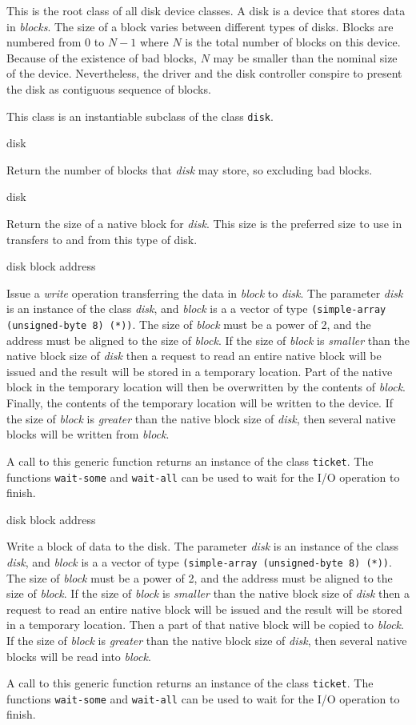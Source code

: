 
This is the root class of all disk device classes.  A disk is a device
that stores data in \emph{blocks}.  The size of a block varies between
different types of disks.  Blocks are numbered from $0$ to $N-1$ where
$N$ is the total number of blocks on this device.  Because of the
existence of bad blocks, $N$ may be smaller than the nominal size of
the device.  Nevertheless, the driver and the disk controller conspire
to present the disk as contiguous sequence of blocks. 


This class is an instantiable subclass of the class \texttt{disk}. 

 {disk}

Return the number of blocks that \textit{disk} may store, so excluding
bad blocks.

 {disk}

Return the size of a native block for \textit{disk}.  This size is the
preferred size to use in transfers to and from this type of disk.

 {disk block address}

Issue a \emph{write} operation transferring the data in \textit{block}
to \textit{disk}.  The parameter \textit{disk} is an
instance of the class \textit{disk}, and \textit{block} is a a vector
of type \texttt{(simple-array (unsigned-byte 8) (*))}.  The size of
\textit{block} must be a power of 2, and the address must be aligned
to the size of \textit{block}.  If the size of \textit{block} is
\emph{smaller} than the native block size of \textit{disk} then a
request to read an entire native block will be issued and the result
will be stored in a temporary location.  Part of the native block in
the temporary location will then be overwritten by the contents of
\textit{block}.  Finally, the contents of the temporary location will
be written to the device.  If the size of \textit{block} is
\emph{greater} than the native block size of \textit{disk}, then
several native blocks will be written from \textit{block}.

A call to this generic function returns an instance of the class
\texttt{ticket}.  The functions \texttt{wait-some} and
\texttt{wait-all} can be used to wait for the I/O operation to finish.

 {disk block address}

Write a block of data to the disk.  The parameter \textit{disk} is an
instance of the class \textit{disk}, and \textit{block} is a a vector
of type \texttt{(simple-array (unsigned-byte 8) (*))}.  The size of
\textit{block} must be a power of 2, and the address must be aligned
to the size of \textit{block}.  If the size of \textit{block} is
\emph{smaller} than the native block size of \textit{disk} then a
request to read an entire native block will be issued and the result
will be stored in a temporary location.  Then a part of that native
block will be copied to \textit{block}.  If the size of \textit{block}
is \emph{greater} than the native block size of \textit{disk}, then
several native blocks will be read into \textit{block}.

A call to this generic function returns an instance of the class
\texttt{ticket}.  The functions \texttt{wait-some} and
\texttt{wait-all} can be used to wait for the I/O operation to finish.

